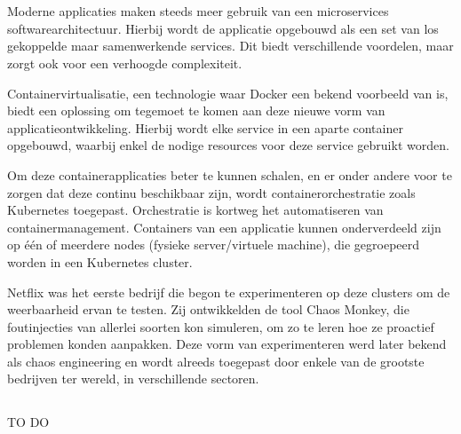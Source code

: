 
\chapter{}
\label{ch:inleiding}

Moderne applicaties maken steeds meer gebruik van een microservices softwarearchitectuur. Hierbij wordt de applicatie opgebouwd als een set van los gekoppelde maar samenwerkende services. Dit biedt verschillende voordelen, maar zorgt ook voor een verhoogde complexiteit. 

Containervirtualisatie, een technologie waar Docker een bekend voorbeeld van is, biedt een oplossing om tegemoet te komen aan deze nieuwe vorm van applicatieontwikkeling. Hierbij wordt elke service in een aparte container opgebouwd, waarbij enkel de nodige resources voor deze service gebruikt worden. 

Om deze containerapplicaties beter te kunnen schalen, en er onder andere voor te zorgen dat deze continu beschikbaar zijn, wordt containerorchestratie zoals Kubernetes toegepast. Orchestratie is kortweg het automatiseren van containermanagement. Containers van een applicatie kunnen onderverdeeld zijn op één of meerdere nodes (fysieke server/virtuele machine), die gegroepeerd worden in een Kubernetes cluster. 

Netflix was het eerste bedrijf die begon te experimenteren op deze clusters om de weerbaarheid ervan te testen. Zij ontwikkelden de tool Chaos Monkey, die foutinjecties van allerlei soorten kon simuleren, om zo te leren hoe ze proactief problemen konden aanpakken. Deze vorm van experimenteren werd later bekend als chaos engineering en wordt alreeds toegepast door enkele van de grootste bedrijven ter wereld, in verschillende sectoren.    

\section{}
\label{sec:probleemstelling}

TO DO

